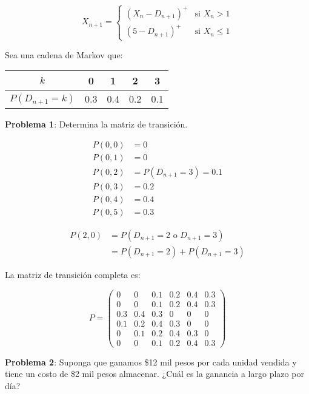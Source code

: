 \documentclass[12pt,a4paper]{article}
\begin{document}
\begin{equation*}
X_{n+1} = \begin{cases}
(X_n - D_{n+1})^+ & \text{si } X_n > 1 \\
(5 - D_{n+1})^+ & \text{si } X_n \leq 1
\end{cases}
\end{equation*}

Sea una cadena de Markov que:

\begin{center}
\begin{tabular}{|c|c|c|c|c|}
\hline
$k$ & 0 & 1 & 2 & 3 \\
\hline
$P(D_{n+1}=k)$ & 0.3 & 0.4 & 0.2 & 0.1 \\
\hline
\end{tabular}
\end{center}

\textbf{Problema 1}: Determina la matriz de transición.

\begin{align*}
P(0,0) &= 0 \\
P(0,1) &= 0 \\
P(0,2) &= P(D_{n+1}=3) = 0.1 \\
P(0,3) &= 0.2 \\
P(0,4) &= 0.4 \\
P(0,5) &= 0.3
\end{align*}

\begin{align*}
P(2,0) &= P(D_{n+1}=2 \text{ o } D_{n+1}=3) \\
&= P(D_{n+1}=2) + P(D_{n+1}=3)
\end{align*}

La matriz de transición completa es:

\begin{equation*}
P = \begin{pmatrix}
0 & 0 & 0.1 & 0.2 & 0.4 & 0.3 \\
0 & 0 & 0.1 & 0.2 & 0.4 & 0.3 \\
0.3 & 0.4 & 0.3 & 0 & 0 & 0 \\
0.1 & 0.2 & 0.4 & 0.3 & 0 & 0 \\
0 & 0.1 & 0.2 & 0.4 & 0.3 & 0 \\
0 & 0 & 0.1 & 0.2 & 0.4 & 0.3
\end{pmatrix}
\end{equation*}

\textbf{Problema 2}: Suponga que ganamos \$12 mil pesos por cada unidad vendida y tiene un costo de \$2 mil pesos almacenar. ¿Cuál es la ganancia a largo plazo por día?
\end{document}
